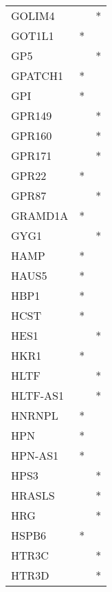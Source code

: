 \begin{longtable}{lcc}
GOLIM4           &                &          * \\
GOT1L1           &              * &            \\
GP5              &                &          * \\
GPATCH1          &              * &            \\
GPI              &              * &            \\
GPR149           &                &          * \\
GPR160           &                &          * \\
GPR171           &                &          * \\
GPR22            &              * &            \\
GPR87            &                &          * \\
GRAMD1A          &              * &            \\
GYG1             &                &          * \\
HAMP             &              * &            \\
HAUS5            &              * &            \\
HBP1             &              * &            \\
HCST             &              * &            \\
HES1             &                &          * \\
HKR1             &              * &            \\
HLTF             &                &          * \\
HLTF-AS1         &                &          * \\
HNRNPL           &              * &            \\
HPN              &              * &            \\
HPN-AS1          &              * &            \\
HPS3             &                &          * \\
HRASLS           &                &          * \\
HRG              &                &          * \\
HSPB6            &              * &            \\
HTR3C            &                &          * \\
HTR3D            &                &          * \\

\end{longtable}
